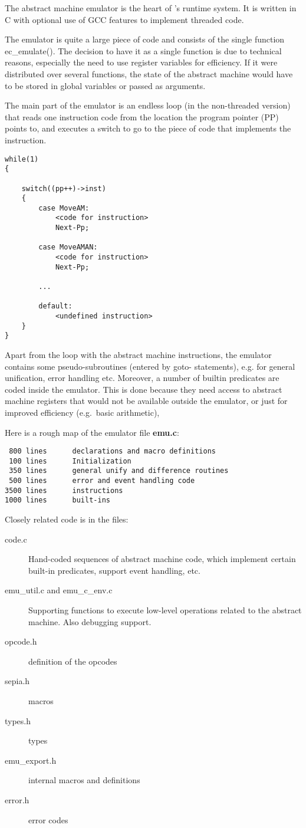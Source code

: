 The abstract machine emulator is the heart of \eclipse's runtime system. 
It is written in C with optional use of GCC features to implement
threaded code.

The emulator is quite a large piece of code and consists of the single
function ec_emulate().  The decision to have it as a single function
is due to technical reasons, especially the need to use register
variables for efficiency.  If it were distributed over several
functions, the state of the abstract machine would have to be stored
in global variables or passed as arguments.

The main part of the emulator is an endless loop (in the non-threaded
version) that reads one instruction code from the location the program
pointer (PP) points to, and executes a switch to go to the piece of
code that implements the instruction.
\begin{verbatim}
while(1)
{

    switch((pp++)->inst)
    {
        case MoveAM:
            <code for instruction>
            Next-Pp;

        case MoveAMAN:
            <code for instruction>
            Next-Pp;

        ...

        default:
            <undefined instruction>
    }
}
\end{verbatim}
Apart from the loop with the abstract machine instructions, the
emulator contains some pseudo-subroutines (entered by goto-
statements), e.g. for general unification, error handling etc. 
Moreover, a number of builtin predicates are coded inside the emulator. 
This is done because they need access to abstract machine registers
that would not be available outside the emulator, or just for improved
efficiency (e.g.\ basic arithmetic),

Here is a rough map of the emulator file {\bf emu.c}:
\begin{verbatim}
 800 lines      declarations and macro definitions
 100 lines      Initialization
 350 lines      general unify and difference routines
 500 lines      error and event handling code
3500 lines      instructions
1000 lines      built-ins
\end{verbatim}


Closely related code is in the files:
\begin{description}
\item[code.c]
        Hand-coded sequences of abstract machine code, which implement
        certain built-in predicates, support event handling, etc.
\item[emu_util.c and emu_c_env.c]
        Supporting functions to execute low-level operations related
        to the abstract machine. Also debugging support.
\item[opcode.h] definition of the opcodes
\item[sepia.h] macros
\item[types.h] types
\item[emu_export.h] internal macros and definitions
\item[error.h] error codes
\end{description}



